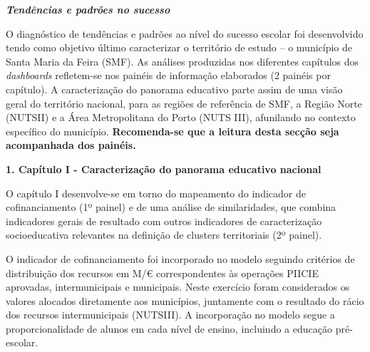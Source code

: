 \documentclass[
]{book}
\begin{document}
\textbf{\emph{Tendências e padrões no sucesso}}

O diagnóstico de tendências e padrões ao nível do sucesso escolar foi desenvolvido tendo como objetivo último caracterizar o território de estudo -- o município de Santa Maria da Feira (SMF). As análises produzidas nos diferentes capítulos dos \emph{dashboards} refletem-se nos painéis de informação elaborados (2 painéis por capítulo). A caracterização do panorama educativo parte assim de uma visão geral do território nacional, para as regiões de referência de SMF, a Região Norte (NUTSII) e a Área Metropolitana do Porto (NUTS III), afunilando no contexto específico do município. \textbf{Recomenda-se que a leitura desta secção seja acompanhada dos painéis.}

\textbf{1. Capítulo I - Caracterização do panorama educativo nacional}

O capítulo I desenvolve-se em torno do mapeamento do indicador de cofinanciamento (1º painel) e de uma análise de similaridades, que combina indicadores gerais de resultado com outros indicadores de caracterização socioeducativa relevantes na definição de clusters territoriais (2º painel).

O indicador de cofinanciamento foi incorporado no modelo seguindo critérios de distribuição dos recursos em M/€ correspondentes às operações PIICIE aprovadas, intermunicipais e municipais. Neste exercício foram considerados os valores alocados diretamente aos municípios, juntamente com o resultado do rácio dos recursos intermunicipais (NUTSIII). A incorporação no modelo segue a proporcionalidade de alunos em cada nível de ensino, incluindo a educação pré-escolar.
\end{document}
